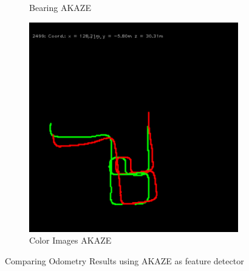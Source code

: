 \begin{figure}[H]
\begin{subfigure}[c]{0.31\linewidth}
    \caption{Bearing AKAZE}
\end{subfigure}%
\begin{subfigure}[c]{0.31\linewidth}
    \includegraphics[width=\linewidth]{chapter06/odo/zhang_pinhole_AKAZE.png}%
    \caption{Color Images AKAZE}
\end{subfigure}
\caption{Comparing Odometry Results using AKAZE as feature detector}
\end{figure}
